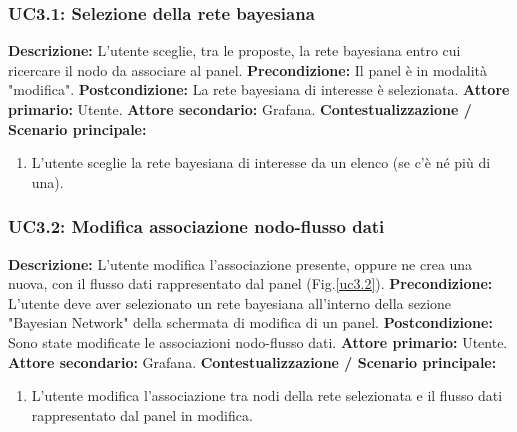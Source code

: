                 \subsubsection{UC3.1: Selezione della rete bayesiana}
                    \textbf{Descrizione:} L’utente sceglie, tra le proposte, la rete bayesiana entro cui ricercare il nodo da associare al panel.
                    \newline
                    \textbf{Precondizione:} Il panel è in modalità "modifica".
                    \newline
                    \textbf{Postcondizione:} La rete bayesiana di interesse è selezionata.
                    \newline
                    \textbf{Attore primario:} Utente.
                    \newline
                    \textbf{Attore secondario:} Grafana.
                    \newline
                    \textbf{Contestualizzazione / Scenario principale:} \begin{enumerate}
                        \item L’utente sceglie la rete bayesiana di interesse da un elenco (se c'è né più di una).
                    \end{enumerate}
                    
               
                
                \subsubsection{UC3.2: Modifica associazione nodo-flusso dati}
                    \textbf{Descrizione:} L’utente modifica l'associazione presente, oppure ne crea una nuova, con il flusso dati rappresentato dal panel (Fig.\ref{uc3.2}).
                    \newline
                    \textbf{Precondizione:} L'utente deve aver selezionato un rete bayesiana all'interno della sezione "Bayesian Network" della schermata di modifica di un panel.
                    \newline
                    \textbf{Postcondizione:} Sono state modificate le associazioni nodo-flusso dati.
                    \newline
                    \textbf{Attore primario:} Utente.
                    \newline
                    \textbf{Attore secondario:} Grafana.
                    \newline
                    \textbf{Contestualizzazione / Scenario principale:} \begin{enumerate}
                        \item L’utente modifica l'associazione tra nodi della rete selezionata e il flusso dati rappresentato dal panel in modifica.
                    \end{enumerate}
                    
